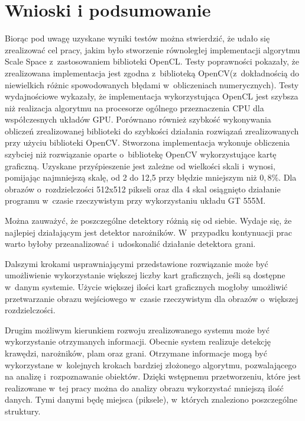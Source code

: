 \chapter{Wnioski i podsumowanie}
\label{cha:podsumowanie}

Biorąc pod uwagę uzyskane wyniki testów można stwierdzić, że udało się zrealizować cel pracy, jakim było stworzenie równoległej implementacji algorytmu Scale Space z~zastosowaniem biblioteki OpenCL. Testy poprawności pokazały, że zrealizowana implementacja jest zgodna z~biblioteką OpenCV(z~dokładnością do niewielkich różnic spowodowanych błędami w~obliczeniach numerycznych). Testy wydajnościowe wykazały, że implementacja wykorzystująca OpenCL jest szybsza niż realizacja algorytmu na procesorze ogólnego przeznaczenia CPU dla współczesnych układów GPU. Porównano również szybkość wykonywania obliczeń zrealizowanej biblioteki do szybkości działania rozwiązań zrealizowanych przy użyciu biblioteki OpenCV. Stworzona implementacja wykonuje obliczenia szybciej niż rozwiązanie oparte o~bibliotekę OpenCV wykorzystujące kartę graficzną. Uzyskane przyśpieszenie jest zależne od wielkości skali i~wynosi, pomijając najmniejszą skalę, od 2 do 12,5 przy błędzie mniejszym niż $ 0,8\% $. Dla obrazów o~rozdzielczości 512x512 pikseli oraz dla 4 skal osiągnięto działanie programu w~czasie rzeczywistym przy wykorzystaniu układu GT 555M.

Można zauważyć, że poszczególne detektory różnią się od siebie. Wydaje się, że najlepiej działającym jest detektor narożników. W~przypadku kontynuacji prac warto byłoby przeanalizować i~udoskonalić działanie detektora grani.

Dalszymi krokami usprawniającymi przedstawione rozwiązanie może być umożliwienie wykorzystanie większej liczby kart graficznych, jeśli są dostępne w~danym systemie. Użycie większej ilości kart graficznych mogłoby umożliwić przetwarzanie obrazu wejściowego w~czasie rzeczywistym dla obrazów o~większej rozdzielczości.

Drugim możliwym kierunkiem rozwoju zrealizowanego systemu może być wykorzystanie otrzymanych informacji. Obecnie system realizuje detekcję krawędzi, narożników, plam oraz grani. Otrzymane informacje mogą być wykorzystane w~kolejnych krokach bardziej złożonego algorytmu, pozwalającego na analizę i~rozpoznawanie obiektów. Dzięki wstępnemu przetworzeniu, które jest realizowane w~tej pracy można do analizy obrazu wykorzystać mniejszą ilość danych. Tymi danymi będę miejsca (piksele), w~których znaleziono poszczególne struktury.
